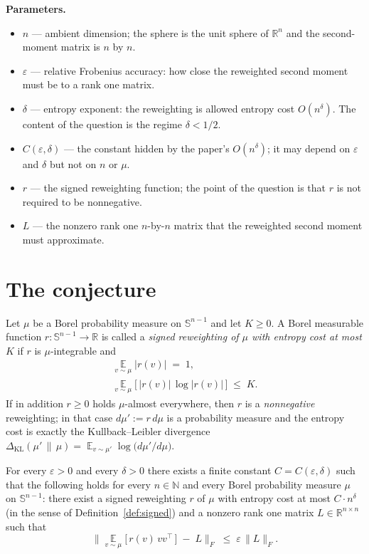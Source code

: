 \documentclass{aicr-conjecture}
\newcommand{\Expect}{\operatorname*{\mathbb{E}}}
\newcommand{\Sph}{\mathbb{S}^{n-1}}
\newcommand{\Reals}{\mathbb{R}}
\newcommand{\Nat}{\mathbb{N}}
\newcommand{\KL}{\Delta_{\mathrm{KL}}}
\begin{document}
\textbf{Parameters.}
\begin{itemize}[leftmargin=1.2em]
\item $n$ --- ambient dimension; the sphere is the unit sphere of
  $\Reals^{n}$ and the second-moment matrix is $n$ by $n$.
\item $\varepsilon$ --- relative Frobenius accuracy: how close the
  reweighted second moment must be to a rank one matrix.
\item $\delta$ --- entropy exponent: the reweighting is allowed
  entropy cost $O(n^{\delta})$. The content of the question is the
  regime $\delta < 1/2$.
\item $C(\varepsilon, \delta)$ --- the constant hidden by the paper's
  $O(n^{\delta})$; it may depend on $\varepsilon$ and $\delta$ but not
  on $n$ or $\mu$.
\item $r$ --- the signed reweighting function; the point of the
  question is that $r$ is not required to be nonnegative.
\item $L$ --- the nonzero rank one $n$-by-$n$ matrix that the
  reweighted second moment must approximate.
\end{itemize}

\section{The conjecture}\label{sec:conjectures}

\begin{definition}\label{def:signed}
Let $\mu$ be a Borel probability measure on $\Sph$ and let $K \ge 0$.
A Borel measurable function $r : \Sph \to \Reals$ is called a
\emph{signed reweighting of $\mu$ with entropy cost at most $K$} if
$r$ is $\mu$-integrable and
\[
\begin{gathered}
  \Expect_{v \sim \mu} \big| r(v) \big| \;=\; 1, \\[0.25em]
  \Expect_{v \sim \mu} \Big[\, \big| r(v) \big| \,
    \log \big| r(v) \big| \,\Big] \;\le\; K .
\end{gathered}
\]
If in addition $r \ge 0$ holds $\mu$-almost everywhere, then $r$ is a
\emph{nonnegative} reweighting; in that case $d\mu' := r \, d\mu$ is a
probability measure and the entropy cost is exactly the
Kullback--Leibler divergence $\KL(\mu' \,\|\, \mu) = \Expect_{v \sim
\mu'} \log\big( d\mu'/d\mu \big)$.
\end{definition}

\begin{conjecture}\label{conj:main}
For every $\varepsilon > 0$ and every $\delta > 0$ there exists a
finite constant $C = C(\varepsilon, \delta)$ such that the following
holds for every $n \in \Nat$ and every Borel probability measure $\mu$
on $\Sph$: there exist a signed reweighting $r$ of $\mu$ with entropy
cost at most $C \cdot n^{\delta}$ (in the sense of
Definition~\ref{def:signed}) and a nonzero rank one matrix $L \in
\Reals^{n \times n}$ such that
\[
  \Big\| \Expect_{v \sim \mu}\big[\, r(v)\, v v^{\top} \,\big]
    \;-\; L \Big\|_{F} \;\le\; \varepsilon \, \|L\|_{F}.
\]
\end{conjecture}
\end{document}
